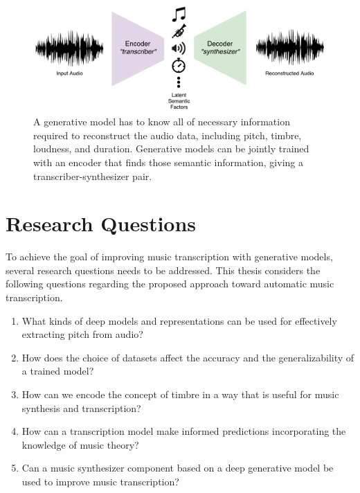 \begin{figure}[t]
	\includegraphics[width=\textwidth]{autoencoder.pdf}
	\caption{A generative model has to know all of necessary information required to reconstruct the audio data, including pitch, timbre, loudness, and duration. Generative models can be jointly trained with an encoder that finds those semantic information, giving a transcriber-synthesizer pair.}
	\label{fig:autoencoder}
\end{figure}

\pagebreak

\section{Research Questions}\label{sec:subproblems}

To achieve the goal of improving music transcription with generative models, several research questions needs to be addressed. This thesis considers the following questions regarding the proposed approach toward automatic music transcription.

\vspace{1em}

\begin{enumerate}
\item What kinds of deep models and representations can be used for effectively extracting pitch from audio?
\item How does the choice of datasets affect the accuracy and the generalizability of a trained model?
\item How can we encode the concept of timbre in a way that is useful for music synthesis and transcription?
\item How can a transcription model make informed predictions incorporating the knowledge of music theory?
\item Can a music synthesizer component based on a deep generative model be used to improve music transcription?
\end{enumerate}

\vspace{1em}

